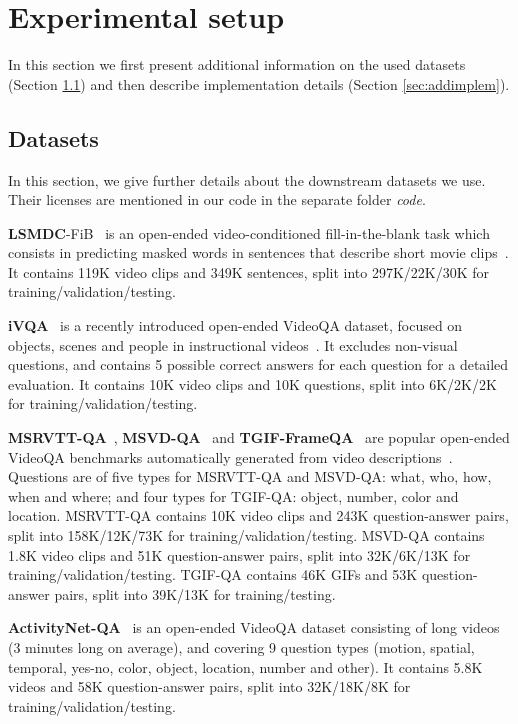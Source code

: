 \section{Experimental setup}\label{sec:adddetails}

In this section we first present additional information on the used datasets (Section \ref{sec:adddata}) and then describe implementation details (Section \ref{sec:addimplem}).

\subsection{Datasets}\label{sec:adddata}

In this section, we give further details about the downstream datasets we use.
Their licenses are mentioned in our code in the separate folder \textit{code}.

\noindent \textbf{LSMDC}-FiB~\cite{maharaj2017dataset} is an open-ended video-conditioned fill-in-the-blank task which consists in predicting masked words in sentences that describe short movie clips~\cite{rohrbach15dataset, rohrbach17movie}.
It contains 119K video clips and 349K sentences, split into 297K/22K/30K for training/validation/testing.

\noindent \textbf{iVQA}~\cite{yang2021just} is a recently introduced open-ended VideoQA dataset, focused on objects, scenes and people in instructional videos~\cite{miech19howto100m}.
It excludes non-visual questions, and contains 5 possible correct answers for each question for a detailed evaluation.
It contains 10K video clips and 10K questions, split into 6K/2K/2K for training/validation/testing.

\noindent \textbf{MSRVTT-QA}~\cite{xu2017video}, \textbf{MSVD-QA}~\cite{xu2017video} and \textbf{TGIF-FrameQA}~\cite{jang2017tgif} are popular open-ended VideoQA benchmarks automatically generated from video descriptions~\cite{chen2011collecting, tgif-cvpr2016, xu16msrvtt}.
Questions are of five types for MSRVTT-QA and MSVD-QA: what, who, how, when and where; and four types for TGIF-QA: object, number, color and location.
MSRVTT-QA contains 10K video clips and 243K question-answer pairs, split into 158K/12K/73K for training/validation/testing.
MSVD-QA contains 1.8K video clips and 51K question-answer pairs, split into 32K/6K/13K for training/validation/testing.
TGIF-QA contains 46K GIFs and 53K question-answer pairs, split into 39K/13K for training/testing.

\noindent \textbf{ActivityNet-QA}~\cite{yu2019activitynet} is an open-ended VideoQA dataset consisting of long videos~\cite{caba2015activitynet} (3 minutes long on average), and covering 9 question types (motion, spatial, temporal, yes-no, color, object, location, number and other).
It contains 5.8K videos and 58K question-answer pairs, split into 32K/18K/8K for training/validation/testing.

